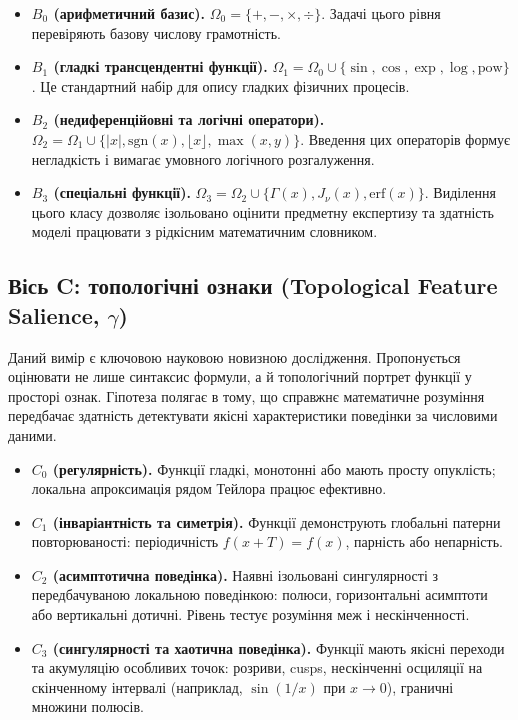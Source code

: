 \documentclass[11pt]{article}
\begin{document}
\begin{itemize}[leftmargin=1.5em]
  \item \textbf{$B_0$ (арифметичний базис).} $\Omega_0=\{+, -, \times, \div\}$. Задачі цього рівня перевіряють базову числову грамотність.
  \item \textbf{$B_1$ (гладкі трансцендентні функції).} $\Omega_1=\Omega_0\cup\{\sin,\cos,\exp,\log,\mathrm{pow}\}$. Це стандартний набір для опису гладких фізичних процесів.
  \item \textbf{$B_2$ (недиференційовні та логічні оператори).} $\Omega_2=\Omega_1\cup\{|x|,\mathrm{sgn}(x),\lfloor x\rfloor,\max(x,y)\}$. Введення цих операторів формує негладкість і вимагає умовного логічного розгалуження.
  \item \textbf{$B_3$ (спеціальні функції).} $\Omega_3=\Omega_2\cup\{\Gamma(x),J_\nu(x),\mathrm{erf}(x)\}$. Виділення цього класу дозволяє ізольовано оцінити предметну експертизу та здатність моделі працювати з рідкісним математичним словником.
\end{itemize}

\subsection{Вісь C: топологічні ознаки (Topological Feature Salience, \texorpdfstring{$\gamma$}{gamma})}

Даний вимір є ключовою науковою новизною дослідження. Пропонується оцінювати не лише синтаксис формули, а й топологічний портрет функції у просторі ознак. Гіпотеза полягає в тому, що справжнє математичне розуміння передбачає здатність детектувати якісні характеристики поведінки за числовими даними.

\begin{itemize}[leftmargin=1.5em]
  \item \textbf{$C_0$ (регулярність).} Функції гладкі, монотонні або мають просту опуклість; локальна апроксимація рядом Тейлора працює ефективно.
  \item \textbf{$C_1$ (інваріантність та симетрія).} Функції демонструють глобальні патерни повторюваності: періодичність $f(x+T)=f(x)$, парність або непарність.
  \item \textbf{$C_2$ (асимптотична поведінка).} Наявні ізольовані сингулярності з передбачуваною локальною поведінкою: полюси, горизонтальні асимптоти або вертикальні дотичні. Рівень тестує розуміння меж і нескінченності.
  \item \textbf{$C_3$ (сингулярності та хаотична поведінка).} Функції мають якісні переходи та акумуляцію особливих точок: розриви, cusps, нескінченні осциляції на скінченному інтервалі (наприклад, $\sin(1/x)$ при $x\to 0$), граничні множини полюсів.
\end{itemize}
\end{document}
